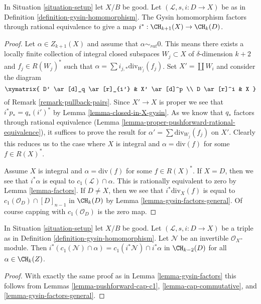 \begin{lemma}
\label{lemma-gysin-factors}
In Situation \ref{situation-setup} let $X/B$ be good.
Let $(\mathcal{L}, s, i : D \to X)$ be as in
Definition \ref{definition-gysin-homomorphism}.
The Gysin homomorphism factors through rational equivalence to
give a map $i^* : \CH_{k + 1}(X) \to \CH_k(D)$.
\end{lemma}

\begin{proof}
Let $\alpha \in Z_{k + 1}(X)$ and assume that $\alpha \sim_{rat} 0$.
This means there exists a locally finite collection of integral
closed subspaces $W_j \subset X$ of $\delta$-dimension $k + 2$
and $f_j \in R(W_j)^*$ such that
$\alpha = \sum i_{j, *}\text{div}_{W_j}(f_j)$.
Set $X' = \coprod W_i$ and consider the diagram
$$
\xymatrix{
D' \ar[d]_q \ar[r]_{i'} & X' \ar[d]^p \\
D \ar[r]^i & X
}
$$
of Remark \ref{remark-pullback-pairs}. Since $X' \to X$ is proper
we see that $i^*p_* = q_*(i')^*$ by Lemma \ref{lemma-closed-in-X-gysin}.
As we know that $q_*$ factors through rational equivalence
(Lemma \ref{lemma-proper-pushforward-rational-equivalence}), it suffices
to prove the result for $\alpha' = \sum \text{div}_{W_j}(f_j)$
on $X'$. Clearly this reduces us to the case where $X$ is integral
and $\alpha = \text{div}(f)$ for some $f \in R(X)^*$.

\medskip\noindent
Assume $X$ is integral and $\alpha = \text{div}(f)$ for some $f \in R(X)^*$.
If $X = D$, then we see that $i^*\alpha$ is equal
to $c_1(\mathcal{L}) \cap \alpha$.
This is rationally equivalent to zero by Lemma \ref{lemma-factors}.
If $D \not = X$, then we see that $i^*\text{div}_X(f)$ is equal to
$c_1(\mathcal{O}_D) \cap [D]_{n - 1}$ in $\CH_k(D)$ by
Lemma \ref{lemma-gysin-factors-general}. Of course
capping with $c_1(\mathcal{O}_D)$ is the zero map.
\end{proof}

\begin{lemma}
\label{lemma-gysin-commutes-cap-c1}
In Situation \ref{situation-setup} let $X/B$ be good.
Let $(\mathcal{L}, s, i : D \to X)$
be a triple as in Definition \ref{definition-gysin-homomorphism}.
Let $\mathcal{N}$ be an invertible $\mathcal{O}_X$-module.
Then $i^*(c_1(\mathcal{N}) \cap \alpha) = c_1(i^*\mathcal{N}) \cap i^*\alpha$
in $\CH_{k - 2}(D)$ for all $\alpha \in \CH_k(Z)$.
\end{lemma}

\begin{proof}
With exactly the same proof as in Lemma \ref{lemma-gysin-factors}
this follows from Lemmas
\ref{lemma-pushforward-cap-c1},
\ref{lemma-cap-commutative}, and
\ref{lemma-gysin-factors-general}.
\end{proof}

